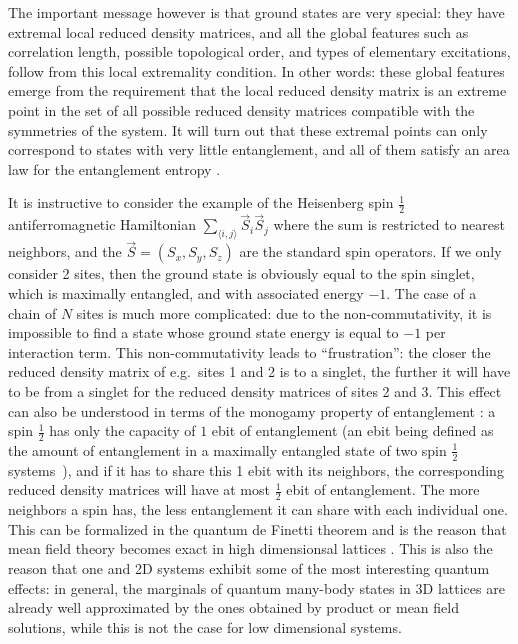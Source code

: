 \documentclass[rmp,aps,reprint,superscriptaddress,nobalancelastpage]{revtex4-1}
\begin{document}
The important message however is that ground states are very special: they have extremal local reduced density matrices, and all the global features such as correlation length, possible topological order, and types of elementary excitations, follow from this local extremality condition. In other words: these global features emerge from the requirement that the local reduced density matrix is an extreme point in the set of all possible reduced density matrices compatible with the symmetries of the system. It will turn out that these extremal points can only correspond to states with very little entanglement, and all of them satisfy an area law for the entanglement entropy \cite{verstraete:faithfully,zauner2016symmetry}.

It is instructive to consider the example of the Heisenberg spin $\tfrac12$ antiferromagnetic Hamiltonian $\sum_{\langle i,j\rangle}\vec{S}_i\vec{S}_j$ where the sum is restricted to nearest neighbors, and the $\vec{S}=(S_x,S_y,S_z)$ are the standard spin operators.
If we only consider 2 sites, then the ground state is obviously equal to the spin singlet, which is maximally entangled, and with associated energy $-1$. The case of a chain of $N$ sites is much  more complicated: due to the non-commutativity, it is impossible to find a state whose ground state energy is equal to $-1$ per interaction term. This non-commutativity leads to ``frustration'': the closer the reduced density matrix of e.g.\ sites 1 and 2 is to a singlet, the further it will have to  be from a singlet for the reduced density matrices of sites 2 and 3.  This effect can also be understood in terms of the monogamy property of entanglement \cite{terhal2004entanglement}: a spin $\tfrac12$ has only the capacity of $1$ ebit of entanglement (an ebit being defined as the amount of entanglement in a maximally entangled state of two spin $\tfrac12$ systems~\cite{nielsen-chuang}), and if it has to share this 1 ebit with its neighbors, the corresponding reduced density matrices will have at most $\tfrac12$ ebit of entanglement. The more neighbors a spin has, the less entanglement it can share with each individual one. This can be formalized in the  quantum de Finetti theorem and is the reason that mean field theory becomes exact in high dimensionsal lattices \cite{raggio1989quantum,brandao:mean-field-approx}. This is also the reason that one and 2D systems exhibit some of the most interesting quantum effects: in general, the marginals of quantum many-body states in 3D lattices are already well approximated by the ones obtained by product or mean field solutions, while this is not the case for low dimensional systems.
\end{document}
